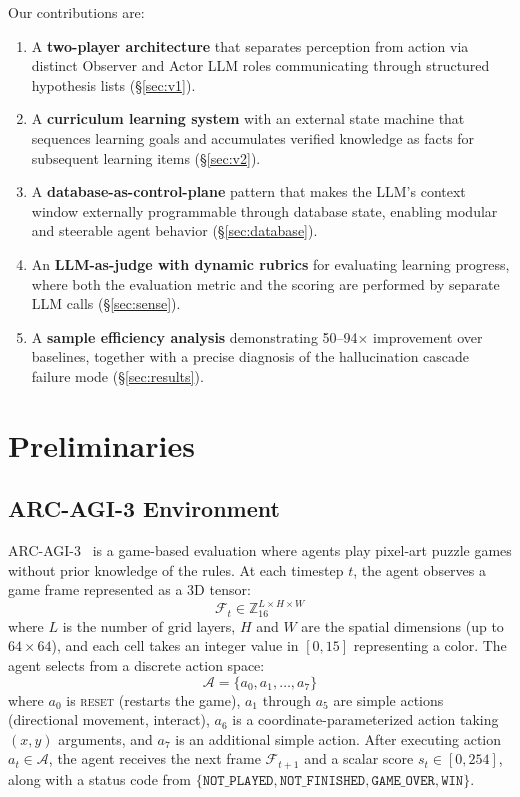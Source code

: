 \documentclass[11pt,letterpaper]{article}
\begin{document}
Our contributions are:
\begin{enumerate}[leftmargin=2em]
  \item A \textbf{two-player architecture} that separates perception from action via distinct Observer and Actor LLM roles communicating through structured hypothesis lists (\S\ref{sec:v1}).
  \item A \textbf{curriculum learning system} with an external state machine that sequences learning goals and accumulates verified knowledge as facts for subsequent learning items (\S\ref{sec:v2}).
  \item A \textbf{database-as-control-plane} pattern that makes the LLM's context window externally programmable through database state, enabling modular and steerable agent behavior (\S\ref{sec:database}).
  \item An \textbf{LLM-as-judge with dynamic rubrics} for evaluating learning progress, where both the evaluation metric and the scoring are performed by separate LLM calls (\S\ref{sec:sense}).
  \item A \textbf{sample efficiency analysis} demonstrating 50--94$\times$ improvement over baselines, together with a precise diagnosis of the hallucination cascade failure mode (\S\ref{sec:results}).
\end{enumerate}


\section{Preliminaries}
\label{sec:prelim}

\subsection{ARC-AGI-3 Environment}
\label{sec:arcagi}

ARC-AGI-3~\citep{arcprize2024arcagi} is a game-based evaluation where agents play pixel-art puzzle games without prior knowledge of the rules. At each timestep $t$, the agent observes a game frame represented as a 3D tensor:
\begin{equation}
  \mathcal{F}_t \in \mathbb{Z}_{16}^{L \times H \times W}
\end{equation}
where $L$ is the number of grid layers, $H$ and $W$ are the spatial dimensions (up to $64 \times 64$), and each cell takes an integer value in $[0, 15]$ representing a color. The agent selects from a discrete action space:
\begin{equation}
  \mathcal{A} = \{a_0, a_1, \ldots, a_7\}
\end{equation}
where $a_0$ is \textsc{reset} (restarts the game), $a_1$ through $a_5$ are simple actions (directional movement, interact), $a_6$ is a coordinate-parameterized action taking $(x, y)$ arguments, and $a_7$ is an additional simple action. After executing action $a_t \in \mathcal{A}$, the agent receives the next frame $\mathcal{F}_{t+1}$ and a scalar score $s_t \in [0, 254]$, along with a status code from $\{\texttt{NOT\_PLAYED}, \texttt{NOT\_FINISHED}, \texttt{GAME\_OVER}, \texttt{WIN}\}$.
\end{document}
